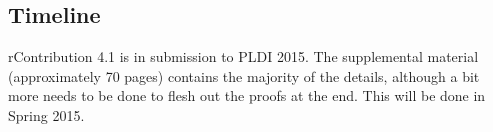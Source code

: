 

\subsection{Timeline}
rContribution 4.1 is in submission to PLDI 2015. The supplemental material (approximately 70 pages) contains the majority of the details, although a bit more needs to be done to flesh out the proofs at the end. This will be done in Spring 2015.



